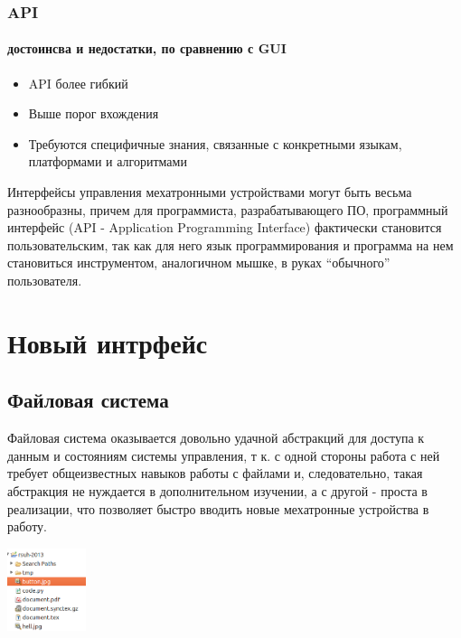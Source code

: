 \documentclass{beamer}
\begin{document}
\begin{frame}
\frametitle{API}
\framesubtitle{достоинсва и недостатки, по сравнению с GUI}
\begin{itemize}
  \item<1> API более гибкий
  \item<2> Выше порог вхождения
  \item<2> Требуются специфичные знания, связанные с конкретными языкам,
  платформами и алгоритмами
\end{itemize}

Интерфейсы управления мехатронными устройствами могут быть весьма разнообразны,
причем для программиста, разрабатывающего ПО, программный интерфейс 
(API - Application Programming Interface) фактически становится пользовательским, 
так как для него язык программирования и программа на нем становиться инструментом, 
аналогичном мышке, в руках “обычного” пользователя.

\end{frame}

\section{Новый интрфейс}
\subsection{Файловая система}
\begin{frame}
Файловая система оказывается довольно удачной абстракций для доступа к данным и
состояниям системы управления, т к. с одной стороны работа с ней требует общеизвестных навыков работы 
с файлами и, следовательно, такая абстракция не нуждается в дополнительном изучении, 
а с другой - проста в реализации, что позволяет быстро вводить новые мехатронные устройства в 
работу.


\includegraphics[width=2.3cm]{file.png}
\end{frame}
\end{document}
